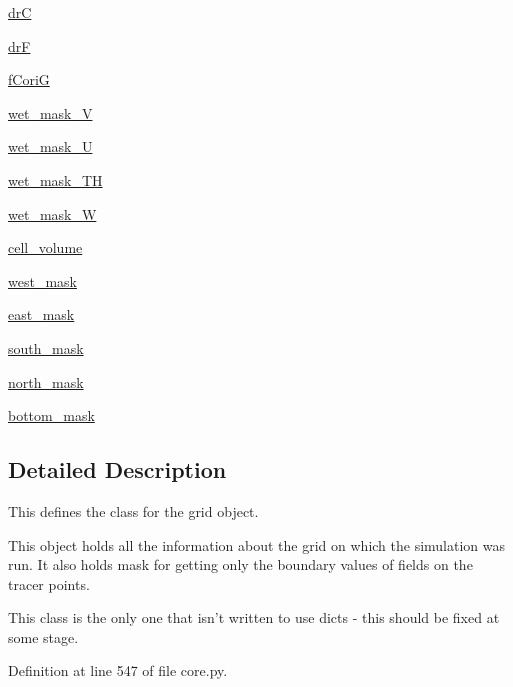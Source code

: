 \begin{DoxyCompactItemize}
\hyperlink{classmitgcm_1_1core_1_1Grid_aecdb2f77448391f837648248342fbc28}{dr\+C}
\item 
\hyperlink{classmitgcm_1_1core_1_1Grid_a75699b4c667aaa6e04c6a0504c6b62ea}{dr\+F}
\item 
\hyperlink{classmitgcm_1_1core_1_1Grid_ad62c4a7ffebe74f9c017b238d3d6ec16}{f\+Cori\+G}
\item 
\hyperlink{classmitgcm_1_1core_1_1Grid_a924a827552b8bfcc08c750637364224f}{wet\+\_\+mask\+\_\+\+V}
\item 
\hyperlink{classmitgcm_1_1core_1_1Grid_aaa07d628d03ff550e2a711ed62dcfc55}{wet\+\_\+mask\+\_\+\+U}
\item 
\hyperlink{classmitgcm_1_1core_1_1Grid_a4f7637908d982efab96f34c32fed20bd}{wet\+\_\+mask\+\_\+\+T\+H}
\item 
\hyperlink{classmitgcm_1_1core_1_1Grid_ada3063facd1f0f929237bf1589224121}{wet\+\_\+mask\+\_\+\+W}
\item 
\hyperlink{classmitgcm_1_1core_1_1Grid_a09a2f1e06b6d74ebd1779140351136a9}{cell\+\_\+volume}
\item 
\hyperlink{classmitgcm_1_1core_1_1Grid_ac9afe3373e16ca1b8343f8669b9eb4bb}{west\+\_\+mask}
\item 
\hyperlink{classmitgcm_1_1core_1_1Grid_ab2303190a4150bf2c67450e6f5514624}{east\+\_\+mask}
\item 
\hyperlink{classmitgcm_1_1core_1_1Grid_a4f70506e6225a48f53c4f57299ad0da8}{south\+\_\+mask}
\item 
\hyperlink{classmitgcm_1_1core_1_1Grid_ade43e2fe2061d12e5945dffee14d7378}{north\+\_\+mask}
\item 
\hyperlink{classmitgcm_1_1core_1_1Grid_a69f90f4bcf5c06fab90674814eff4de9}{bottom\+\_\+mask}
\end{DoxyCompactItemize}


\subsection{Detailed Description}
This defines the class for the grid object. 

This object holds all the information about the grid on which the simulation was run. It also holds mask for getting only the boundary values of fields on the tracer points. \begin{DoxyVerb}This class is the only one that isn't written to use dicts - this should be fixed at some stage. \end{DoxyVerb}
 

Definition at line 547 of file core.\+py.



